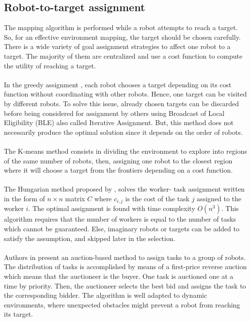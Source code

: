 \documentclass[11pt,openany]{book}
\begin{document}
\subsection{Robot-to-target assignment}
The mapping algorithm is performed while a robot attempts to reach a target. So, for an effective environment mapping, the target should be chosen carefully. There is a wide variety of goal assignment strategies to affect one robot to a target. The majority of them are centralized and use a cost function to compute the utility of reaching a target.\\\\
In the greedy assignment \cite{yamauchi1998frontier}, each robot chooses a target depending on its cost function without coordinating with other robots. Hence, one target can be visited by different robots. To solve this issue, already chosen targets can be discarded before being considered for assignment by others using Broadcast of Local Eligibility (BLE) \cite{werger2000broadcast} also called Iterative Assignment. But, this method does not necessarily produce the optimal solution since it depends on the order of robots.\\\\
The K-means method \cite{solanas2004coordinated} consists in dividing the environment to explore into regions of the same number of robots, then, assigning one robot to the closest region where it will choose a target from the frontiers depending on a cost function.\\\\
The Hungarian method \cite{deb1999multi} proposed by \cite{kuhn2005hungarian}, solves the worker- task assignment written in the form of $n \times n$ matrix $C$ where $c_{i,j}$ is the cost of the task $j$ assigned to the worker $i$. The optimal assignment is found with time complexity $O(n^3)$. This algorithm requires that the number of workers is equal to the number of tasks which cannot be guaranteed. Else, imaginary robots or targets can be added to satisfy the assumption, and skipped later in the selection.\\\\
Authors in \cite{nanjanath2006dynamic} present an auction-based method to assign tasks to a group of robots. The distribution of tasks is accomplished by means of a first-price reverse auction which means that the auctioneer is the buyer. One task is auctioned one at a time by priority. Then, the auctioneer selects the best bid and assigns the task to the corresponding bidder. The algorithm is well adapted to dynamic environments, where unexpected obstacles might prevent a robot from reaching its target.\\\\
\end{document}
